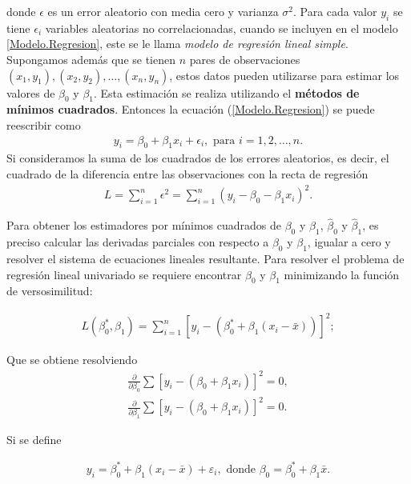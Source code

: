 \documentclass[12pt]{article}
\begin{document}
donde $\epsilon$ es un error aleatorio con media cero y varianza $\sigma^{2}$. Para cada valor $y_{i}$ se tiene $\epsilon_{i}$ variables aleatorias no correlacionadas, cuando se incluyen en el modelo \ref{Modelo.Regresion}, este se le llama \textit{modelo de regresi\'on lineal simple}. Supongamos adem\'as que se tienen $n$ pares de observaciones $\left(x_{1},y_{1}\right),\left(x_{2},y_{2}\right),\ldots,\left(x_{n},y_{n}\right)$,  estos datos pueden utilizarse para estimar los valores de $\beta_{0}$ y $\beta_{1}$. Esta estimaci\'on se realiza utilizando el \textbf{m\'etodos de m\'inimos cuadrados}. Entonces la ecuaci\'on (\ref{Modelo.Regresion}) se puede reescribir como
\begin{eqnarray}\label{Modelo.Regresion.dos}
y_{i}=\beta_{0}+\beta_{1}x_{i}+\epsilon_{i},\textrm{ para }i=1,2,\ldots,n.
\end{eqnarray}
Si consideramos la suma de los cuadrados de los errores aleatorios, es decir, el cuadrado de la diferencia entre las observaciones con la recta de regresi\'on 
\begin{eqnarray*}
L=\sum_{i=1}^{n}\epsilon^{2}=\sum_{i=1}^{n}\left(y_{i}-\beta_{0}-\beta_{1}x_{i}\right)^{2}.
\end{eqnarray*}

Para obtener los estimadores por m\'inimos cuadrados de $\beta_{0}$ y $\beta_{1}$,  $\hat{\beta}_{0}$ y $\hat{\beta}_{1}$, es preciso calcular las derivadas parciales con respecto a $\beta_{0}$ y $\beta_{1}$,  igualar a cero y  resolver el sistema de ecuaciones lineales resultante. Para resolver el problema de regresi\'on lineal univariado se requiere encontrar $\beta_0$ y $\beta_1$ minimizando la funci\'on de versosimilitud:

\begin{eqnarray*}
L(\beta_0^*, \beta_1) = \sum_{i=1}^{n} [y_i - (\beta_0^* + \beta_1(x_i - \bar{x}))]^2;
\end{eqnarray*}


Que se obtiene resolviendo
\begin{eqnarray*}
\frac{\partial}{\partial \beta_0} \sum \left[ y_i - (\beta_0 + \beta_1 x_i) \right]^2 = 0,\\
\frac{\partial}{\partial \beta_1} \sum \left[ y_i - (\beta_0 + \beta_1 x_i) \right]^2 = 0.
\end{eqnarray*}

Si se define

\begin{eqnarray*}
y_i = \beta_0^* + \beta_1 (x_i - \bar{x}) + \varepsilon_i,\textrm{ donde }\beta_0 = \beta_0^* + \beta_1 \bar{x}.
\end{eqnarray*}
\end{document}
